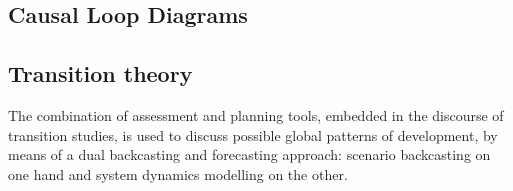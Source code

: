 \subsection{Causal Loop Diagrams}
\label{ss:methods:causal-loop-diagram-development}


\subsection{Transition theory}
The combination of assessment and planning tools, embedded in the discourse of transition studies, is used to discuss possible global patterns of development, by means of a dual backcasting and forecasting approach: scenario backcasting on one hand and system dynamics modelling on the other.